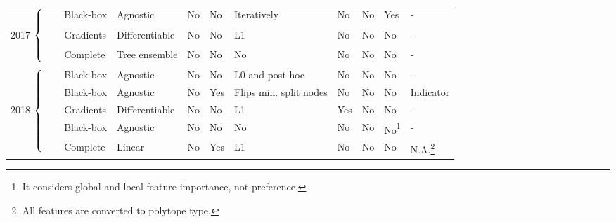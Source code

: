 \begin{table*}
{\begin{tabular}{m{}m{}m{}m{}m{}m{}m{}m{}m{}m{}m{}}
 \midrule
 \multirow{3}{*}{2017 $\begin{dcases*} \\ \\ \\ \\  \end{dcases*}$} & \citep{inverse-classification2} & Black-box & Agnostic & No & No & Iteratively & No & No & Yes & - \\
 & \citep{wachter_counterfactual_2017} & Gradients & Differentiable & No & No & L1 & No & No & No & - \\
 & \citep{Tolomei2017:Interpretable} & Complete & Tree ensemble & No & No & No & No & No & No & - \\
 \multirow{5}{*}{2018 $\begin{dcases*} \\ \\ \\ \\ \\ \\ \end{dcases*}$} & \citep{medina_comparison-based_2018} & Black-box & Agnostic & No & No & L0 and post-hoc & No & No & No & - \\ %
 & \citep{guidotti_local_2018} & Black-box & Agnostic & No & Yes & Flips min. split nodes & No & No & No & Indicator \\ %
 & \citep{dhurandhar_explanations_2018} & Gradients & Differentiable & No & No & L1 & Yes & No & No & - \\ %
 & \citep{grath_interpretable_2018} & Black-box & Agnostic & No & No & No & No & No & No\footnote{It considers global and local feature importance, not preference.} & - \\ %
 \multirow{8}{*}{2019 $\begin{dcases*} \\ \\ \\ \\ \\ \\ \\ \\ \\ \\ \\ \\ \end{dcases*}$} & \citep{russell_efficient_2019} & Complete & Linear & No & Yes & L1 & No & No & No & N.A.\footnote{All features are converted to polytope type.} \\ %

\end{tabular}}
\end{table*}
